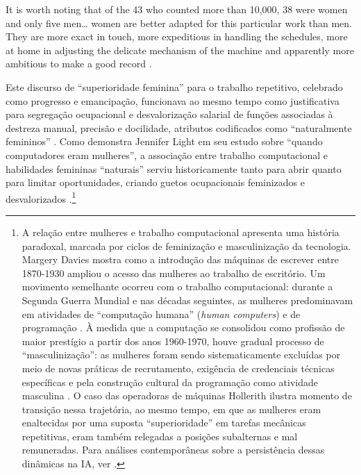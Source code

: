 \begin{citacaoabnt}
It is worth noting that of the 43 who counted more than 10,000, 38 were women and only five men\ldots{} women are better adapted for this particular work than men. They are more exact in touch, more expeditious in handling the schedules, more at home in adjusting the delicate mechanism of the machine and apparently more ambitious to make a good record \parencite[p.~83]{Austrian1982Hollerith}.
\end{citacaoabnt}

Este discurso de \enquote{superioridade feminina} para o trabalho repetitivo, celebrado como progresso e emancipação, funcionava ao mesmo tempo como justificativa para segregação ocupacional e desvalorização salarial de funções associadas à destreza manual, precisão e docilidade, atributos codificados como \enquote{naturalmente femininos} \parencite{Cockburn1983Brothers}. Como demonstra Jennifer Light em seu estudo sobre \enquote{quando computadores eram mulheres}, a associação entre trabalho computacional e habilidades femininas \enquote{naturais} serviu historicamente tanto para abrir quanto para limitar oportunidades, criando guetos ocupacionais feminizados e desvalorizados \parencite{Light1999When}.\footnote{A relação entre mulheres e trabalho computacional apresenta uma história paradoxal, marcada por ciclos de feminização e masculinização da tecnologia. Margery Davies \parencite{Davies1982Typewriter} mostra como a introdução das máquinas de escrever entre 1870-1930 ampliou o acesso das mulheres ao trabalho de escritório. Um movimento semelhante ocorreu com o trabalho computacional: durante a Segunda Guerra Mundial e nas décadas seguintes, as mulheres predominavam em atividades de \enquote{computação humana} (\textit{human computers}) e de programação \parencite{Light1999When, Grier2005When}. À medida que a computação se consolidou como profissão de maior prestígio a partir dos anos 1960-1970, houve gradual processo de \enquote{masculinização}: as mulheres foram sendo sistematicamente excluídas por meio de novas práticas de recrutamento, exigência de credenciais técnicas específicas e pela construção cultural da programação como atividade masculina \parencite{Ensmenger2010Computer, Abbate2012Recoding}. O caso das operadoras de máquinas Hollerith ilustra momento de transição nessa trajetória, ao mesmo tempo, em que as mulheres eram enaltecidas por uma suposta \enquote{superioridade} em tarefas mecânicas repetitivas, eram também relegadas a posições subalternas e mal remuneradas. Para análises contemporâneas sobre a persistência dessas dinâmicas na IA, ver \parencite{Benjamin2019RaceAfter, DIganzio2020Data, Noble2018Algorithms}.}

